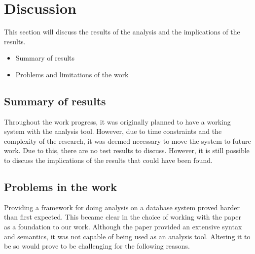 \section{Discussion}\label{sec:discussion}
This section will discuss the results of the analysis and the implications of the results.

\begin{itemize}
    \item Summary of results
    \item Problems and limitations of the work
\end{itemize}




\subsection{Summary of results}\label{subsec:summaryresults}
Throughout the work progress, it was originally planned to have a working system with the analysis tool.
However,
due to time constraints and the complexity of the research,
it was deemed necessary to move the system to future work.
Due to this, there are no test results to discuss.
However, it is still possible to discuss the implications of the results that could have been found.


\subsection{Problems in the work}\label{subsec:workproblems}
Providing a framework for doing analysis on a database system proved harder than first expected.
This became clear in the choice of working with the paper~\cite{halder_abstract_2012} as a foundation to our work.
Although the paper provided an extensive syntax and semantics, it was not capable of being used as an analysis tool.
Altering it to be so would prove to be challenging for the following reasons.

